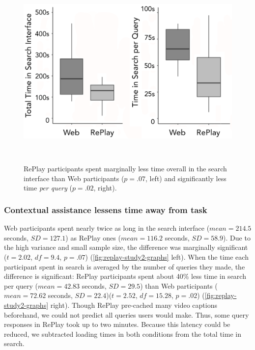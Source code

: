 \begin{figure}[b!]
\centering
  \includegraphics[width=1\textwidth]{replay/figures/study2_graphs.png}
  \caption{RePlay participants spent marginally less time overall in the search interface than Web participants ($p\!=\!.07$, left) and significantly less time \textit{per query} ($p\!=\!.02$, right).}~\label{fig:replay-study2-graphs}
  \vspace{-0.2in}
\end{figure}


\subsubsection{Contextual assistance lessens time away from task}
Web participants spent nearly twice as long in the search interface ($mean\!=\!214.5$ seconds, $SD\!=\!127.1$) as RePlay ones ($mean\!=\!116.2$ seconds, $SD\!=\!58.9$). Due to the high variance and small sample size, the difference was marginally significant ($t\!=\!2.02$, $df\!=\!9.4$, $p\!=\!.07$) (\autoref{fig:replay-study2-graphs} left). When the time each participant spent in search is averaged by the number of queries they made, the difference is significant: RePlay participants spent about 40\% less time in search per query ($mean\!=\!42.83$ seconds, $SD\!=\!29.5$) than Web participants ($mean\!=\!72.62$ seconds, $SD\!=\!22.4$)($t\!=\!2.52$, $df\!=\!15.28$, $p\!=\!.02$) (\autoref{fig:replay-study2-graphs} right). Though RePlay pre-cached many video captions beforehand, we could not predict all queries users would make. Thus, some query responses in RePlay took up to two minutes. Because this latency could be reduced, we subtracted loading times in both conditions from the total time in search.

